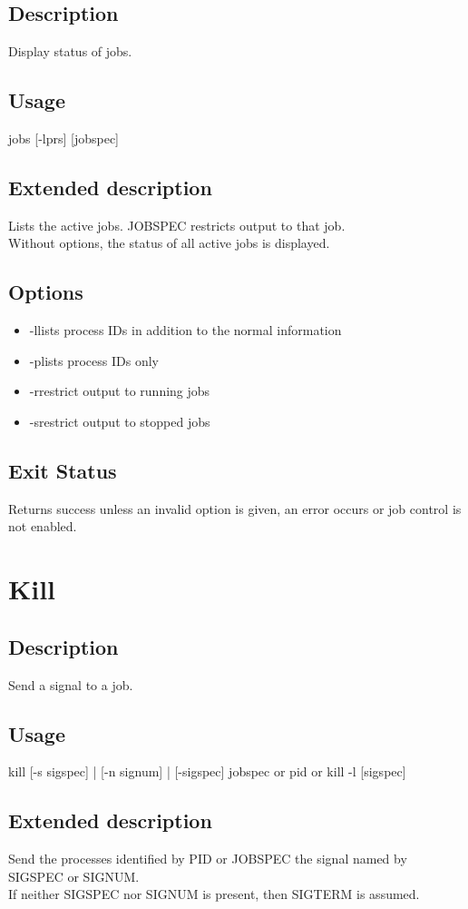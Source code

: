 \documentclass[12pt,a4paper]{report}
\begin{document}
\section{Description}
Display status of jobs.
\section{Usage}
jobs [-lprs] [jobspec]
\section{Extended description}
Lists the active jobs.  JOBSPEC restricts output to that job.\\
Without options, the status of all active jobs is displayed.
\section{Options}
\begin{itemize}
	\item -l\hspace{7 mm}lists process IDs in addition to the normal information
	\item -p\hspace{7 mm}lists process IDs only
	\item -r\hspace{7 mm}restrict output to running jobs
	\item -s\hspace{7 mm}restrict output to stopped jobs
\end{itemize}
\section{Exit Status}
Returns success unless an invalid option is given, an error occurs or job control is not enabled.
\newpage

\chapter{Kill}
\section{Description}
Send a signal to a job.
\section{Usage}
kill [-s sigspec] | [-n signum] | [-sigspec] jobspec or pid or kill -l [sigspec]
\section{Extended description}
Send the processes identified by PID or JOBSPEC the signal named by SIGSPEC or SIGNUM.\\
If neither SIGSPEC nor SIGNUM is present, then SIGTERM is assumed.
\end{document}
